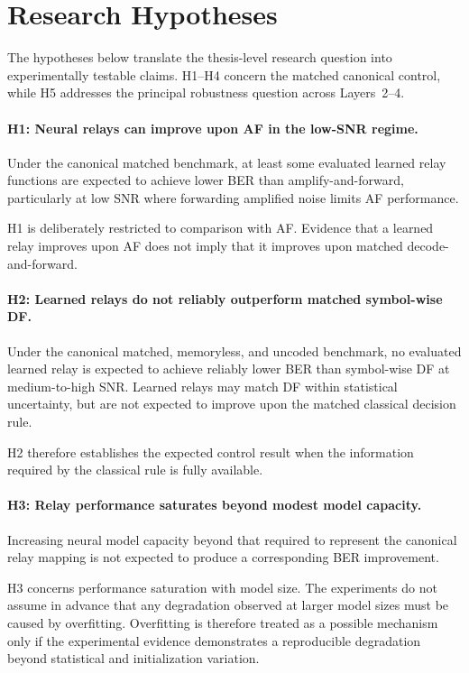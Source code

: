 \section{Research Hypotheses}
\label{sec:research-hypotheses}

The hypotheses below translate the thesis-level research question into
experimentally testable claims. H1--H4 concern the matched canonical control,
while H5 addresses the principal robustness question across Layers~2--4.


\paragraph{H1: Neural relays can improve upon AF in the low-SNR regime.}

Under the canonical matched benchmark, at least some evaluated learned relay
functions are expected to achieve lower BER than amplify-and-forward,
particularly at low SNR where forwarding amplified noise limits AF
performance.

H1 is deliberately restricted to comparison with AF. Evidence that a learned
relay improves upon AF does not imply that it improves upon matched
decode-and-forward.


\paragraph{H2: Learned relays do not reliably outperform matched symbol-wise
DF.}

Under the canonical matched, memoryless, and uncoded benchmark, no evaluated
learned relay is expected to achieve reliably lower BER than symbol-wise DF at
medium-to-high SNR. Learned relays may match DF within statistical uncertainty,
but are not expected to improve upon the matched classical decision rule.

H2 therefore establishes the expected control result when the information
required by the classical rule is fully available.


\paragraph{H3: Relay performance saturates beyond modest model capacity.}

Increasing neural model capacity beyond that required to represent the
canonical relay mapping is not expected to produce a corresponding BER
improvement.

H3 concerns performance saturation with model size. The experiments do not
assume in advance that any degradation observed at larger model sizes must be
caused by overfitting. Overfitting is therefore treated as a possible
mechanism only if the experimental evidence demonstrates a reproducible
degradation beyond statistical and initialization variation.


